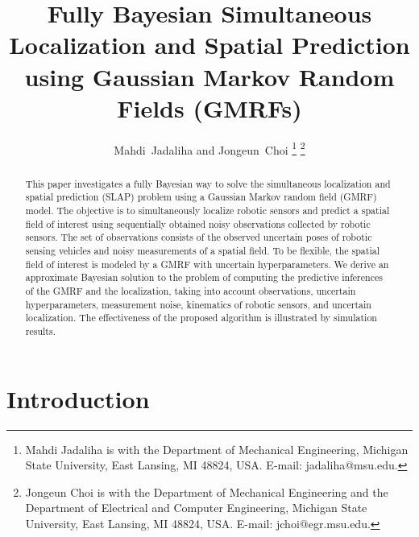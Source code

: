 \documentclass[letterpaper, 10 pt, conference]{ieeeconf}
\begin{document}
\title{\LARGE \bf Fully Bayesian Simultaneous Localization and Spatial Prediction using Gaussian Markov Random Fields (GMRFs)}

\author{Mahdi~Jadaliha and Jongeun~Choi
 \thanks{Mahdi Jadaliha is with the Department of Mechanical Engineering,
 Michigan State University, East Lansing, MI 48824, USA. E-mail:
 jadaliha@msu.edu.}
 \thanks{Jongeun Choi is with the Department of Mechanical
 Engineering and the Department of Electrical and Computer Engineering, Michigan
 State University, East Lansing, MI 48824, USA. E-mail:
 jchoi@egr.msu.edu.}}
\maketitle
\thispagestyle{empty}
\pagestyle{empty}

\begin{abstract}
This paper investigates a fully Bayesian way to solve the simultaneous localization and spatial prediction (SLAP) problem using a Gaussian Markov random field (GMRF) model. The objective is to simultaneously localize robotic sensors and predict a spatial field of interest using sequentially obtained noisy observations collected by robotic sensors. The set of observations consists of the observed uncertain poses of robotic sensing vehicles and noisy measurements of a spatial field. To be flexible, the spatial field of interest is modeled by a GMRF with uncertain hyperparameters. We derive an approximate Bayesian solution to the problem of computing the predictive inferences of the GMRF and the localization, taking into account observations, uncertain hyperparameters, measurement noise, kinematics of robotic sensors, and uncertain localization. 
The effectiveness of the proposed algorithm is illustrated by simulation results.
\end{abstract}

%
\section{Introduction}
\end{document}
